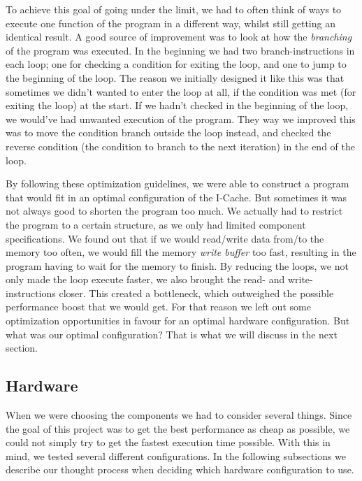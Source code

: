 \documentclass[a4paper,9pt,fleqn]{article}
\begin{document}
To achieve this goal of going under the limit, we had to often think of ways to execute one function of the
program in a different way, whilst still getting an identical result. A good source of improvement was to look
at how the {\it branching} of the program was executed. In the beginning we had two branch-instructions in each
loop; one for checking a condition for exiting the loop, and one to jump to the beginning of the loop. The reason
we initially designed it like this was that sometimes we didn't wanted to enter the loop at all, if the condition was
met (for exiting the loop) at the start. If we hadn't checked in the beginning of the loop, we would've had unwanted
execution of the program. They way we improved this was to move the condition branch outside the loop instead, and
checked the reverse condition (the condition to branch to the next iteration) in the end of the loop.

By following these optimization guidelines, we were able to construct a program that would fit in an optimal
configuration of the I-Cache. But sometimes it was not always good to shorten the program too much. We actually
had to restrict the program to a certain structure, as we only had limited component specifications. We found
out that if we would read/write data from/to the memory too often, we would fill the memory {\it write buffer} too fast,
resulting in the program having to wait for the memory to finish. By reducing the loops, we not only made the loop
execute faster, we also brought the read- and write-instructions closer. This created a bottleneck, which outweighed
the possible performance boost that we would get. For that reason we left out some optimization opportunities in
favour for an optimal hardware configuration. But what was our optimal configuration? That is what we will discuss in
the next section.

\subsection{Hardware}
When we were choosing the components we had to consider several things. Since the goal of this project was to get the best
performance as cheap as possible, we could not simply try to get the fastest execution time possible. With this in mind,
we tested several different configurations. In the following subsections we describe our thought process when deciding
which hardware configuration to use.
\end{document}
